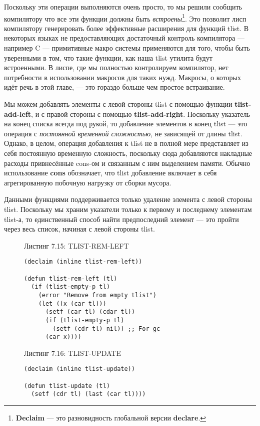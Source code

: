 Поскольку эти операции выполняются очень просто, то мы решили сообщить компилятору что все эти функции должны быть \emph{встроены}\footnote{\textbf{Declaim} --- это разновидность глобальной версии \textbf{declare}.}. Это позволит лисп компилятору генерировать более эффективные расширения для функций tlist. В некоторых языках не предоставляющих достаточный контроль компилятора --- например C --- примитивные макро системы применяются для того, чтобы быть уверенными в том, что такие функции, как наша tlist утилита будут встроенными. В лиспе, где мы полностью контролируем компилятор, нет потребности в использовании макросов для таких нужд. Макросы, о которых идёт речь в этой главе, --- это гораздо больше чем простое встраивание.

Мы можем добавлять элементы с левой стороны tlist с помощью функции \textbf{tlist-add-left}, и с правой стороны с помощью \textbf{tlist-add-right}. Поскольку указатель на конец списка всегда под рукой, то добавление элементов в конец tlist --- это операция с \emph{постоянной временной сложностью}, не зависящей от длины tlist. Однако, в целом, операция добавления к tlist не в полной мере представляет из себя постоянную временную сложность, поскольку сюда добавляются накладные расходы привнесённые cons-ом и связанным с ним выделением памяти. Обычно использование \textbf{cons} обозначает, что tlist добавление включает в себя агрегированную побочную нагрузку от сборки мусора.

Данными функциями поддерживается только удаление элемента с левой стороны tlist. Поскольку мы храним указатели только к первому и последнему элементам tlist-а, то единственный способ найти предпоследний элемент --- это пройти через весь список, начиная с левой стороны tlist.

\begin{figure}Листинг 7.15: TLIST-REM-LEFT\label{listing_7.15}
\listbegin
\begin{verbatim}
(declaim (inline tlist-rem-left))

(defun tlist-rem-left (tl)
  (if (tlist-empty-p tl)
    (error "Remove from empty tlist")
    (let ((x (car tl)))
      (setf (car tl) (cdar tl))
      (if (tlist-empty-p tl)
        (setf (cdr tl) nil)) ;; For gc
      (car x))))
\end{verbatim}
\listend
\end{figure}

\begin{figure}Листинг 7.16: TLIST-UPDATE\label{listing_7.16}
\listbegin
\begin{verbatim}
(declaim (inline tlist-update))

(defun tlist-update (tl)
  (setf (cdr tl) (last (car tl))))
\end{verbatim}
\listend
\end{figure}

